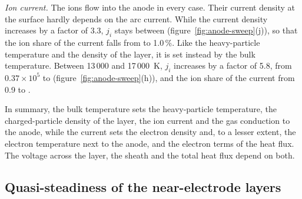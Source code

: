 \emph{Ion current.} The ions flow into the anode in every case. Their current density at the surface hardly depends on the arc current. While the current density increases by a factor of 3.3, \(j_i\) stays between  (figure~\ref{fig:anode-sweep}(j)), so that the ion share of the current falls from  to 1.0\,\%. Like the heavy-particle temperature and the density of the layer, it is set instead by the bulk temperature. Between 13\,000 and 17\,000~K, \(j_i\) increases by a factor of 5.8, from \(0.37\times10^{5}\) to  (figure~\ref{fig:anode-sweep}(h)), and the ion share of the current from 0.9 to .

In summary, the bulk temperature sets the heavy-particle temperature, the charged-particle density of the layer, the ion current and the gas conduction to the anode, while the current sets the electron density and, to a lesser extent, the electron temperature next to the anode, and the electron terms of the heat flux. The voltage across the layer, the sheath and the total heat flux depend on both.

\subsection{Quasi-steadiness of the near-electrode layers}
\label{sec:res-time}

